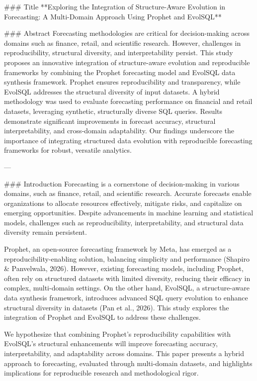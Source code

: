 ### Title
**Exploring the Integration of Structure-Aware Evolution in Forecasting: A Multi-Domain Approach Using Prophet and EvolSQL**

### Abstract
Forecasting methodologies are critical for decision-making across domains such as finance, retail, and scientific research. However, challenges in reproducibility, structural diversity, and interpretability persist. This study proposes an innovative integration of structure-aware evolution and reproducible frameworks by combining the Prophet forecasting model and EvolSQL data synthesis framework. Prophet ensures reproducibility and transparency, while EvolSQL addresses the structural diversity of input datasets. A hybrid methodology was used to evaluate forecasting performance on financial and retail datasets, leveraging synthetic, structurally diverse SQL queries. Results demonstrate significant improvements in forecast accuracy, structural interpretability, and cross-domain adaptability. Our findings underscore the importance of integrating structured data evolution with reproducible forecasting frameworks for robust, versatile analytics.

---

### Introduction
Forecasting is a cornerstone of decision-making in various domains, such as finance, retail, and scientific research. Accurate forecasts enable organizations to allocate resources effectively, mitigate risks, and capitalize on emerging opportunities. Despite advancements in machine learning and statistical models, challenges such as reproducibility, interpretability, and structural data diversity remain persistent.

Prophet, an open-source forecasting framework by Meta, has emerged as a reproducibility-enabling solution, balancing simplicity and performance (Shapiro & Panvelwala, 2026). However, existing forecasting models, including Prophet, often rely on structured datasets with limited diversity, reducing their efficacy in complex, multi-domain settings. On the other hand, EvolSQL, a structure-aware data synthesis framework, introduces advanced SQL query evolution to enhance structural diversity in datasets (Pan et al., 2026). This study explores the integration of Prophet and EvolSQL to address these challenges.

We hypothesize that combining Prophet’s reproducibility capabilities with EvolSQL’s structural enhancements will improve forecasting accuracy, interpretability, and adaptability across domains. This paper presents a hybrid approach to forecasting, evaluated through multi-domain datasets, and highlights implications for reproducible research and methodological rigor.

